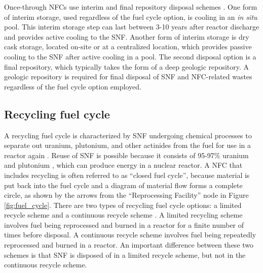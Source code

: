 Once-through \glspl{NFC} use interim and final repository disposal schemes
\cite{rodriguez-penalonga_review_2017}. One form of interim 
storage, used regardless of 
the fuel cycle option, is cooling in an \textit{in situ} pool. 
This interim storage step can last between 3-10 years after reactor 
discharge \cite{rodriguez-penalonga_review_2017}
and provides active cooling to the \gls{SNF}.
Another form of interim storage is dry cask storage, located 
on-site or at a centralized location, which provides passive 
cooling to the \gls{SNF} after active cooling in a pool. The second disposal 
option is a final repository, which typically takes the form of a 
deep geologic repository. 
A geologic repository is required for final disposal of \gls{SNF} and 
\gls{NFC}-related wastes regardless of the fuel cycle option employed. 

\subsection{Recycling fuel cycle}
A recycling fuel cycle is characterized by \gls{SNF} undergoing chemical 
processes to separate out uranium, plutonium, and other 
actinides from the fuel for use in a reactor again \cite{rodriguez-penalonga_review_2017}. 
Reuse of \gls{SNF} is possible because it consists of 95-97\% uranium and 
plutonium \cite{rodriguez-penalonga_review_2017}, which can  
produce energy in a nuclear reactor. A \gls{NFC} that includes 
recycling is often referred to as ``closed fuel cycle'', because material is 
put back into the fuel cycle and a diagram of material flow forms 
a complete circle, as shown by the arrows from the ``Reprocessing Facility''
node in Figure \ref{fig:fuel_cycle}. 
There are two types of recycling fuel cycle options: a limited 
recycle scheme and a continuous recycle scheme \cite{wigeland_nuclear_2014}. 
A limited recycling scheme involves fuel being reprocessed and burned in 
a reactor for a finite number of times before disposal. A continuous 
recycle scheme involves fuel being repeatedly reprocessed and burned in 
a reactor. An 
important difference between these two schemes is that \gls{SNF} is 
disposed of in a limited recycle scheme, but not in the continuous 
recycle scheme. 

